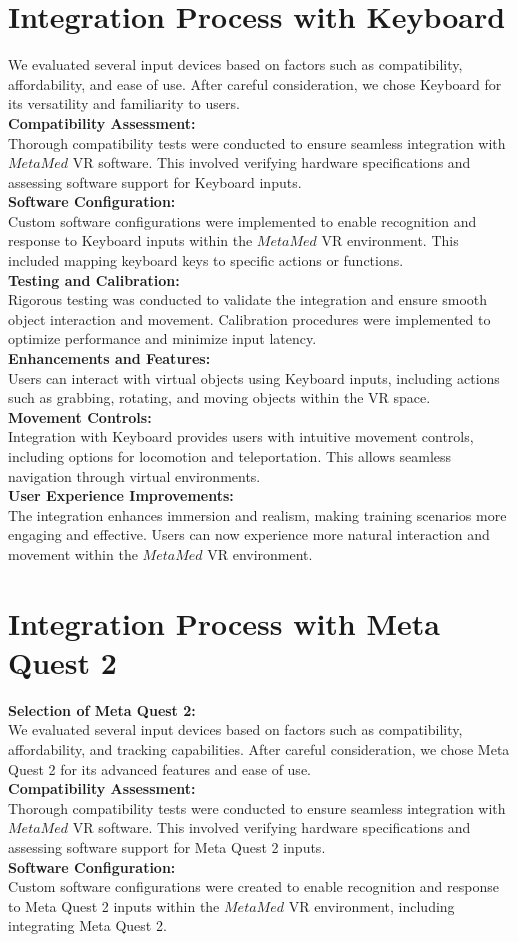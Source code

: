 \section{Integration Process with Keyboard}
We evaluated several input devices based on factors such as compatibility, affordability, and ease of use. After careful consideration, we chose Keyboard for its versatility and familiarity to users.\\
\textbf{Compatibility Assessment:}\\
Thorough compatibility tests were conducted to ensure seamless integration with $MetaMed$ VR software. This involved verifying hardware specifications and assessing software support for Keyboard inputs.\\
\textbf{Software Configuration:}\\
Custom software configurations were implemented to enable recognition and response to Keyboard inputs within the $MetaMed$ VR environment. This included mapping keyboard keys to specific actions or functions.\\
\textbf{Testing and Calibration:}\\
Rigorous testing was conducted to validate the integration and ensure smooth object interaction and movement. Calibration procedures were implemented to optimize performance and minimize input latency.\\
\textbf{Enhancements and Features:}\\ 
Users can interact with virtual objects using Keyboard inputs, including actions such as grabbing, rotating, and moving objects within the VR space.\\
\textbf{Movement Controls:}\\
Integration with Keyboard provides users with intuitive movement controls, including options for locomotion and teleportation. This allows seamless navigation through virtual environments.\\
\textbf{User Experience Improvements:}\\
The integration enhances immersion and realism, making training scenarios more engaging and effective. Users can now experience more natural interaction and movement within the $MetaMed$ VR environment.
\section{Integration Process with Meta Quest 2}
\textbf{Selection of Meta Quest 2:}\\
We evaluated several input devices based on factors such as compatibility, affordability, and tracking capabilities. After careful consideration, we chose Meta Quest 2 for its advanced features and ease of use.\\
\textbf{Compatibility Assessment:}\\
Thorough compatibility tests were conducted to ensure seamless integration with $MetaMed$ VR software. This involved verifying hardware specifications and assessing software support for Meta Quest 2 inputs.\\
\textbf{Software Configuration:}\\
Custom software configurations were created to enable recognition and response to Meta Quest 2 inputs within the $MetaMed$ VR environment, including integrating Meta Quest 2.
